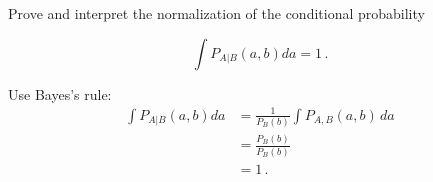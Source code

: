 

Prove and interpret the normalization of the conditional probability

\begin{equation*}
\int P_{A|B}(a, b) da = 1 \, .
\end{equation*}


Use Bayes's rule:
\begin{align*}
\int P_{A|B}(a, b) da
&= \frac{1}{P_B(b)} \int P_{A,B}(a, b) \, da \\
&= \frac{P_B(b)}{P_B(b)} \\
&= 1 \, .
\end{align*}
